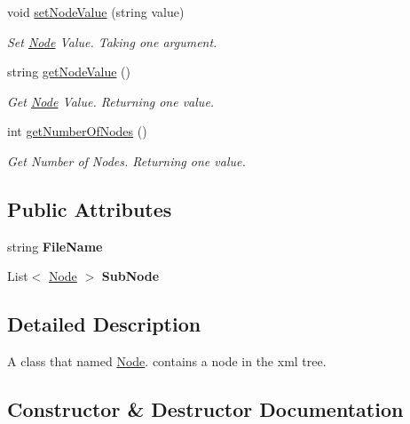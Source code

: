 \begin{DoxyCompactItemize}
void \mbox{\hyperlink{class_animal_change_1_1_node_a26766ab5a8c12f560f96ce7253273b77}{set\+Node\+Value}} (string value)
\begin{DoxyCompactList}\small\item\em Set \mbox{\hyperlink{class_animal_change_1_1_node}{Node}} Value. Taking one argument. \end{DoxyCompactList}\item 
string \mbox{\hyperlink{class_animal_change_1_1_node_a3d72b6b2f442dcb1254eacdbb45c5d5d}{get\+Node\+Value}} ()
\begin{DoxyCompactList}\small\item\em Get \mbox{\hyperlink{class_animal_change_1_1_node}{Node}} Value. Returning one value. \end{DoxyCompactList}\item 
int \mbox{\hyperlink{class_animal_change_1_1_node_aa796b68392c237af7808a15c01c384c0}{get\+Number\+Of\+Nodes}} ()
\begin{DoxyCompactList}\small\item\em Get Number of Nodes. Returning one value. \end{DoxyCompactList}\end{DoxyCompactItemize}
\subsection*{Public Attributes}
\begin{DoxyCompactItemize}
\item 
\mbox{\label{class_animal_change_1_1_node_a749e8e44c92c916434a3652073c9a5f0}} 
string {\bfseries File\+Name}
\item 
\mbox{\label{class_animal_change_1_1_node_af7065c690421627793167f33cbb8d4e2}} 
List$<$ \mbox{\hyperlink{class_animal_change_1_1_node}{Node}} $>$ {\bfseries Sub\+Node}
\end{DoxyCompactItemize}


\subsection{Detailed Description}
A class that named \mbox{\hyperlink{class_animal_change_1_1_node}{Node}}. contains a node in the xml tree. 

\subsection{Constructor \& Destructor Documentation}
\mbox{\label{class_animal_change_1_1_node_ab61b9908056398b7dbae90ef77d79f95}} 
